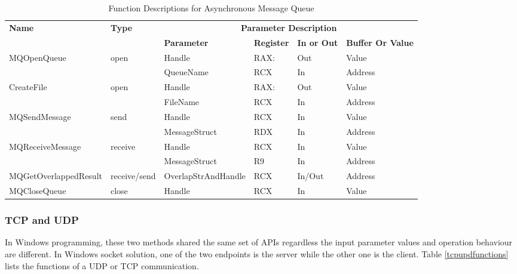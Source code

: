 \begin{table}[H]
  \centering
  \caption{Function Descriptions for Asynchronous Message Queue}
  \label{msmqasynfunctions}
  \begin{tabular}{|l|l|l|l|l|l|}
    \hline
     \multirow{2}{*}{{\textbf{Name}}} & \multirow{2}{*}{{\textbf{Type}}} & \multicolumn{4}{c|}{\textbf{Parameter Description}}  \\
      \cline{3-6} 
     & & \textbf{Parameter}& \textbf{Register}& \textbf{In or Out} &  \textbf{Buffer Or Value}  \\
     \hline
     \multirow{2}{*}{MQOpenQueue}
     &\multirow{2}{*}{open} &  Handle & RAX: & Out & Value\\
      \cline{3-6} 
     & & QueueName & RCX & In & Address\\
    \hline         
    \multirow{2}{*}{CreateFile}
     &\multirow{2}{*}{open} &  Handle & RAX: & Out & Value\\
      \cline{3-6} 
     & & FileName & RCX & In & Address\\
    \hline              
    \multirow{2}{*}{MQSendMessage}
     &\multirow{2}{*}{send} &  Handle & RCX & In & Value\\
      \cline{3-6} 
     & & MessageStruct & RDX & In & Address\\
    \hline            
    \multirow{2}{*}{MQReceiveMessage}
     &\multirow{2}{*}{receive} &  Handle & RCX & In & Value\\
      \cline{3-6} 
     & & MessageStruct & R9 & In & Address\\
    \hline            
    MQGetOverlappedResult &
     receive/send &  OverlapStrAndHandle & RCX & In/Out & Address\\
     \hline            
     MQCloseQueue &
      close &  Handle & RCX & In & Value\\
    \hline               
\end{tabular}
\end{table}


    
\subsubsection{TCP and UDP}
In Windows programming, these two methods shared the same set of APIs regardless the input parameter values and operation behaviour are different. In Windows socket solution, one of the two endpoints is the server while the other one is the client. Table \ref{tcpupdfunctions} lists the functions of a UDP or TCP communication. 

